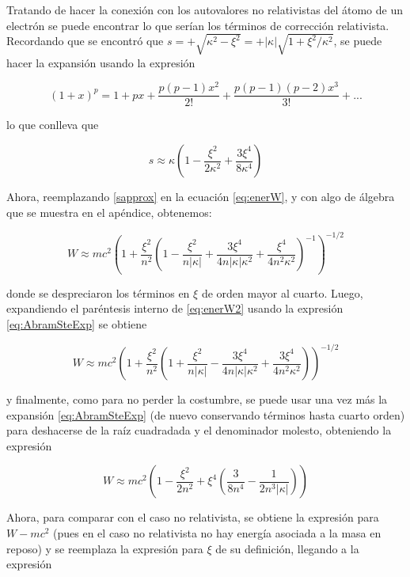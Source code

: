 \documentclass[a4paper, 12pt]{article} %
\begin{document}
Tratando de hacer la conexi\'on con los autovalores no relativistas del \'atomo de un electr\'on se puede encontrar lo que ser\'ian los t\'erminos de correcci\'on relativista. Recordando que se encontr\'o que $s=+\sqrt{\kappa^2 - \xi^2}=+|\kappa|\sqrt{1+\xi^2/\kappa^2}$, se puede hacer la expansi\'on usando la expresi\'on

\begin{equation}\label{eq:AbramSteExp}
(1+x)^p =1+px+\frac{p(p-1)x^2}{2!}+\frac{p(p-1)(p-2)x^3}{3!}+...
\end{equation}

lo que conlleva que

\begin{equation}\label{sapprox}
s\approx \kappa \left( 1-\frac{\xi^2}{2\kappa^2}+\frac{3\xi^4}{8\kappa^4}  \right)
\end{equation}

Ahora, reemplazando \ref{sapprox} en la ecuaci\'on \ref{eq:enerW}, y con algo de \'algebra que se muestra en el ap\'endice, obtenemos:

\begin{equation}\label{eq:enerW2}
W \approx mc^2 \left( 1+ \frac{\xi^2}{n^2} \left( 1-\frac{\xi^2}{n|\kappa|} + \frac{3\xi^4}{4n|\kappa|\kappa^2} + \frac{\xi^4}{4n^2\kappa^2} \right)^{-1}  \right)^{-1/2}
\end{equation}

donde se despreciaron los t\'erminos en $\xi$ de orden mayor al cuarto. Luego, expandiendo el par\'entesis interno de \ref{eq:enerW2} usando la expresi\'on \ref{eq:AbramSteExp} se obtiene 


\begin{equation}\label{eq:enerW3}
W \approx mc^2 \left( 1+ \frac{\xi^2}{n^2} \left( 1 + \frac{\xi^2}{n|\kappa|} - \frac{3\xi^4}{4n|\kappa|\kappa^2} + \frac{3\xi^4}{4n^2\kappa^2} \right)  \right)^{-1/2}
\end{equation}

y finalmente, como para no perder la costumbre, se puede usar una vez m\'as la expansi\'on \ref{eq:AbramSteExp} (de nuevo conservando t\'erminos hasta cuarto orden) para deshacerse de la ra\'iz cuadradada y el denominador molesto, obteniendo la expresi\'on

\begin{equation}\label{eq:enerW4}
W\approx mc^2 \left(  1- \frac{\xi^2}{2n^2} +\xi^4 \left( \frac{3}{8n^4}-\frac{1}{2n^3 |\kappa|} \right)  \right)
\end{equation}

Ahora, para comparar con el caso no relativista, se obtiene la expresi\'on para $W-mc^2$ (pues en el caso no relativista no hay energ\'ia asociada a la masa en reposo) y se reemplaza la expresi\'on para $\xi$ de su definici\'on, llegando a la expresi\'on 
\end{document}
